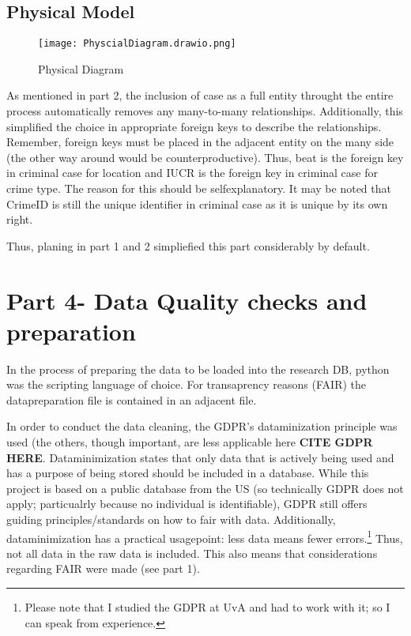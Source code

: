 \documentclass[a4paper]{article}
\begin{document}
\subsection{Physical Model}


\begin{figure}[htp]
		\centering
			\texttt{[image: PhyscialDiagram.drawio.png]}
         \small
         \caption{Physical Diagram}
\end{figure}

As mentioned in part 2, the inclusion of case as a full entity throught the entire process automatically removes any many-to-many relationships. Additionally, this simplified the choice in appropriate foreign keys to describe the relationships. Remember, foreign keys must be placed in the adjacent entity on the many side (the other way around would be counterproductive). Thus, beat is the foreign key in criminal case for location and IUCR is the foreign key in criminal case for crime type. The reason for this should be selfexplanatory. It may be noted that CrimeID is still the unique identifier in criminal case as it is unique by its own right. 

Thus, planing in part 1 and 2 simpliefied this part considerably by default. 


\section{Part 4- Data Quality checks and preparation}

In the process of preparing the data to be loaded into the research DB, python was the scripting language of choice. For transaprency reasons (FAIR) the datapreparation file is contained in an adjacent file. 

In order to conduct the data cleaning, the GDPR's dataminization principle was used (the others, though important, are less applicable here \textbf{CITE GDPR HERE}. Dataminimization states that only data that is actively being used and has a purpose of being stored should be included in a database. While this project is based on a public database from the US (so technically GDPR does not apply; particualrly because no individual is identifiable), GDPR still offers guiding principles/standards on how to fair with data. Additionally, dataminimization has a practical usagepoint: less data means fewer errors.\footnote{Please note that I studied the GDPR at UvA and had to work with it; so I can speak from experience.} Thus, not all data in the raw data is included. This also means that considerations regarding FAIR were made (see part 1).  
\end{document}
